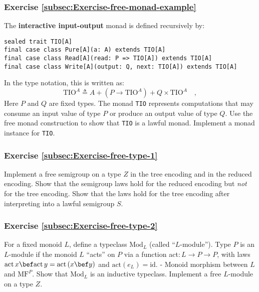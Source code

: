 \subsubsection{Exercise \label{subsec:Exercise-free-monad-example}\ref{subsec:Exercise-free-monad-example}}

The \textbf{interactive input-output}
monad is defined recursively by:
\begin{lstlisting}
sealed trait TIO[A]
final case class Pure[A](a: A) extends TIO[A]
final case class Read[A](read: P => TIO[A]) extends TIO[A]
final case class Write[A](output: Q, next: TIO[A]) extends TIO[A]
\end{lstlisting}
In the type notation, this is written as:
\[
\text{TIO}^{A}\triangleq A+(P\rightarrow\text{TIO}^{A})+Q\times\text{TIO}^{A}\quad,
\]
Here $P$ and $Q$ are fixed types. The monad \lstinline!TIO!
represents computations that may consume an input value of type $P$
or produce an output value of type $Q$. Use the free monad construction
to show that \lstinline!TIO!
is a lawful monad. Implement a monad instance for \lstinline!TIO!.

\subsubsection{Exercise \label{subsec:Exercise-free-type-1}\ref{subsec:Exercise-free-type-1}}

Implement a free semigroup on a type $Z$ in the tree encoding and
in the reduced encoding. Show that the semigroup laws hold for the
reduced encoding but \emph{not} for the tree encoding. Show that the
laws hold for the tree encoding after interpreting into a lawful semigroup
$S$.

\subsubsection{Exercise \label{subsec:Exercise-free-type-2}\ref{subsec:Exercise-free-type-2}}

For a fixed monoid $L$, define a typeclass $\text{Mod}_{L}$ (called
\textsf{``}$L$-module\textsf{''}). Type $P$ is an $L$-module if the monoid $L$
\textsf{``}acts\textsf{''} on $P$ via a function act$:L\rightarrow P\rightarrow P$,
with laws $\text{act}\,x\bef\text{act}\,y=\text{act}\left(x\bef y\right)$
and $\text{act}\left(e_{L}\right)=\text{id}$. - Monoid morphism between
$L$ and $\text{MF}^{P}$. Show that $\text{Mod}_{L}$ is an inductive
typeclass. Implement a free $L$-module on a type $Z$. 

